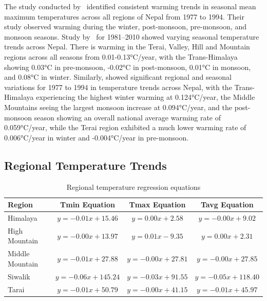 The study conducted by~\textcite{shrestha_climate_2011} identified consistent warming trends in seasonal mean maximum temperatures across all regions of Nepal from 1977 to 1994. Their study observed warming during the winter, post-monsoon, pre-monsoon, and monsoon seasons.
Study  by~\textcite{nayava_spatial_2017} for 1981–2010 showed varying seasonal temperature trends across Nepal. There is warming in the Terai, Valley, Hill and Mountain regions across all seasons from 0.01-0.13°C/year, with the Trans-Himalaya showing 0.03°C in pre-monsoon, -0.02°C in post-monsoon, 0.01°C in monsoon, and 0.08°C in winter. Similarly, \textcite{shrestha_maximum_1999}  showed significant regional and seasonal variations for 1977 to 1994 in temperature trends across Nepal, with the Trans-Himalaya experiencing the highest winter warming at 0.124°C/year, the Middle Mountains seeing the largest monsoon increase at 0.094°C/year, and the post-monsoon season showing an overall national average warming rate of 0.059°C/year, while the Terai region exhibited a much lower warming rate of 0.006°C/year in winter and -0.004°C/year in pre-monsoon.

\subsection{Regional Temperature Trends}

\begin{table}[htbp]
  \centering
  \caption{Regional temperature regression equations}
  \begin{tabular}{@{}lccc@{}}
      \toprule
      \textbf{Region} & \textbf{Tmin Equation} & \textbf{Tmax Equation} & \textbf{Tavg Equation} \\ 
      \midrule
      Himalaya & \( y = -0.01x + 15.46 \) & \( y = 0.00x + 2.58 \) & \( y = -0.00x + 9.02 \) \\ 
      High Mountain & \( y = -0.00x + 13.97 \) & \( y = 0.01x - 9.35 \) & \( y = 0.00x + 2.31 \) \\ 
      Middle Mountain & \( y = -0.01x + 27.88 \) & \( y = -0.00x + 27.81 \) & \( y = -0.00x + 27.85 \) \\ 
      Siwalik & \( y = -0.06x + 145.24 \) & \( y = -0.03x + 91.55 \) & \( y = -0.05x + 118.40 \) \\ 
      Tarai & \( y = -0.01x + 50.79 \) & \( y = -0.00x + 41.15 \) & \( y = -0.01x + 45.97 \) \\ 
      \bottomrule
  \end{tabular}
  \label{tab:regression_equations}
\end{table}


